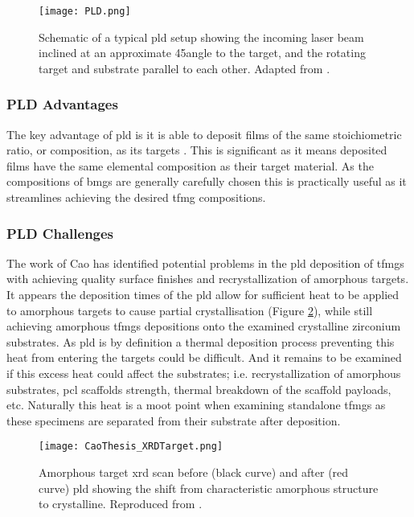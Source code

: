 \documentclass[a4paper,12pt,oneside]{report}%
\begin{document}
\begin{figure}[htbp]
	\centering
	\texttt{[image: PLD.png]}
	\caption[Schematic of a typical \acrshort{pld} setup showing the incoming laser beam inclined at an approximate 45\degree angle to the target, and the rotating target and substrate parallel to each other.]{Schematic of a typical \acrshort{pld} setup showing the incoming laser beam inclined at an approximate 45\degree angle to the target, and the rotating target and substrate parallel to each other. Adapted from \cite{Krebs1993}.}
	\label{fig:PLD}
\end{figure}

\subsubsection{PLD Advantages}
The key advantage of \gls{pld} is it is able to deposit films of the same stoichiometric ratio, or composition, as its targets \cite{Dijkkamp1987, Heitz1990}. This is significant as it means deposited films have the same elemental composition as their target material. As the compositions of \glspl{bmg} are generally carefully chosen this is practically useful as it streamlines achieving the desired \gls{tfmg} compositions. 

\subsubsection{PLD Challenges}
The work of Cao \cite{Cao2013} has identified potential problems in the \gls{pld} deposition of \glspl{tfmg} with achieving quality surface finishes and recrystallization of amorphous targets. It appears the deposition times of the \gls{pld} allow for sufficient heat to be applied to amorphous targets to cause partial crystallisation (Figure \ref{fig:ReCryTarget}), while still achieving amorphous \glspl{tfmg} depositions onto the examined crystalline zirconium substrates. As \gls{pld} is by definition a thermal deposition process preventing this heat from entering the targets could be difficult. And it remains to be examined if this excess heat could affect the substrates; i.e. recrystallization of amorphous substrates, \gls{pcl} scaffolds strength, thermal breakdown of the scaffold payloads, etc. Naturally this heat is a moot point when examining standalone \glspl{tfmg} as these specimens are separated from their substrate after deposition. 

\begin{figure}[htbp]
	\centering
	\texttt{[image: CaoThesis\_XRDTarget.png]}
	\caption[Amorphous target \acrshort{xrd} scan before (black curve) and after (red curve) \acrshort{pld} showing the shift from characteristic amorphous structure to crystalline.]{Amorphous target \acrshort{xrd} scan before (black curve) and after (red curve) \acrshort{pld} showing the shift from characteristic amorphous structure to crystalline. Reproduced from \cite{Cao2013}.}
	\label{fig:ReCryTarget}
\end{figure}
\end{document}

